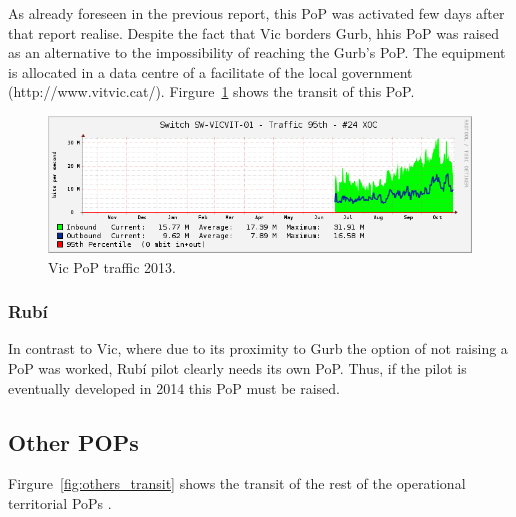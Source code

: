 As already foreseen in the previous report, this PoP was activated few days after that report realise. Despite the fact that Vic borders Gurb, hhis PoP was raised as an alternative to the impossibility of reaching the Gurb's PoP. The equipment is allocated in a data centre of a facilitate of the local government (http://www.vitvic.cat/). Firgure~\ref{fig:vic_transit} shows the transit of this PoP.

\begin{figure}[H]
  \centering
  \includegraphics[width=0.95\linewidth]{sect3/figures/vic.png} 
  \caption[Vic PoP traffic 2013]{Vic PoP traffic 2013.}
  \label{fig:vic_transit}
\end{figure}


\FloatBarrier
\subsubsection{Rub\'{i}}
\label{pop_rubi}

In contrast to Vic, where due to its proximity to Gurb the option of not raising a PoP was worked, Rubí pilot clearly needs its own PoP. Thus, if the pilot is eventually developed in 2014 this PoP must be raised.


\FloatBarrier
\subsection{Other POPs}
\label{pop_others}

Firgure~\ref{fig:others_transit} shows the transit of the rest of the operational territorial PoPs .


